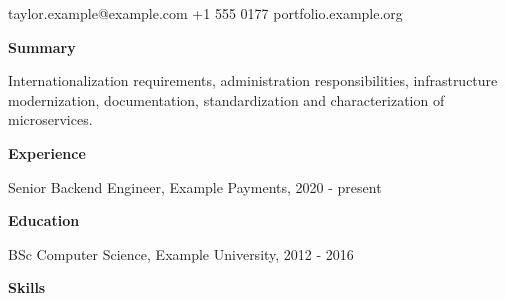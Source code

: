 \documentclass[10pt]{article}
\begin{document}
{\LARGE \Person}\par taylor.example@example.com \quad +1 555 0177 \quad portfolio.example.org\par\bigskip
\textbf{Summary}\par
\parbox{4.2cm}{Internationalization requirements, administration responsibilities, infrastructure
modernization, documentation, standardization and characterization of microservices.}\par\medskip
\textbf{Experience}\par Senior Backend Engineer, Example Payments, 2020 - present\par \JobA\par\medskip
\textbf{Education}\par BSc Computer Science, Example University, 2012 - 2016\par\medskip
\textbf{Skills}\par \SkillsLine\par
\end{document}
